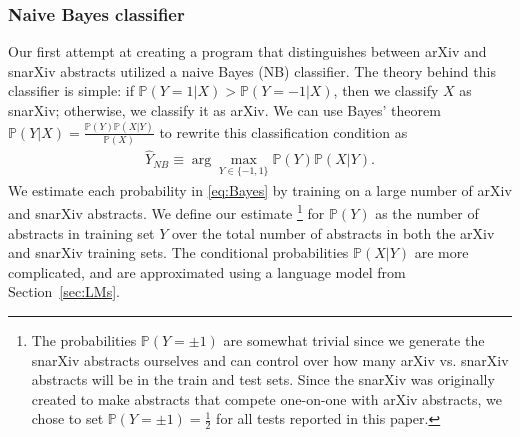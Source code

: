 \documentclass{article}
\renewcommand{\P}{\mathbb{P}}
\begin{document}
\subsubsection{Naive Bayes classifier}
Our first attempt at creating a program that distinguishes between arXiv and snarXiv abstracts utilized a naive Bayes (NB) classifier.
The theory behind this classifier is simple: if $\P(Y=1|X) > \P(Y=-1|X)$, then we classify $X$ as snarXiv; otherwise, we classify it as arXiv.
We can use Bayes' theorem $\P(Y|X) = \frac{\P(Y)\P(X|Y)}{\P(X)}$ to rewrite this classification condition as
\begin{align}
  \widehat{Y}_{NB} \equiv \arg\max_{Y\in\{-1,1\}} \P(Y)\P(X|Y). \label{eq:Bayes}
\end{align}
We estimate each probability in \eqref{eq:Bayes} by training on a large number of arXiv and snarXiv abstracts.
We define our estimate%
\footnote{The probabilities $\P(Y=\pm1)$ are somewhat trivial since we generate the snarXiv abstracts ourselves and can control over how many arXiv vs. snarXiv abstracts will be in the train and test sets. Since the snarXiv was originally created to make abstracts that compete one-on-one with arXiv abstracts, we chose to set $\P(Y=\pm1)=\tfrac{1}{2}$ for all tests reported in this paper.}
%
for $\P(Y)$ as the number of abstracts in training set $Y$ over the total number of abstracts in both the arXiv and snarXiv training sets.
The conditional probabilities $\P(X|Y)$ are more complicated, and are approximated using a language model from Section~\ref{sec:LMs}.
\end{document}
